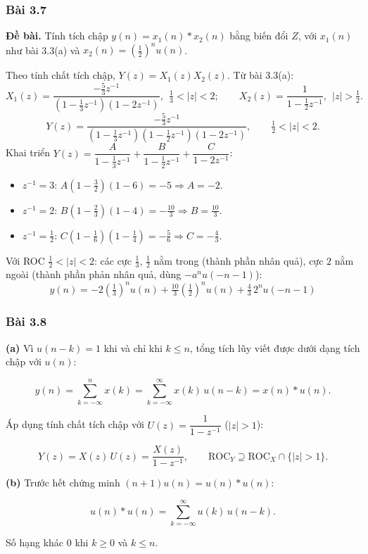 \documentclass[12pt,a4paper]{article}
\begin{document}
\subsubsection*{Bài 3.7}
\textbf{Đề bài.} Tính tích chập $y(n)=x_1(n)*x_2(n)$ bằng biến đổi $Z$, với $x_1(n)$ như bài 3.3(a) và $x_2(n)=\left(\tfrac12\right)^nu(n)$.

Theo tính chất tích chập, $Y(z)=X_1(z)X_2(z)$. Từ bài 3.3(a):
\[
X_1(z)=\frac{-\frac53z^{-1}}{\left(1-\frac13z^{-1}\right)\left(1-2z^{-1}\right)},\ \ \tfrac13<|z|<2;\qquad
X_2(z)=\frac{1}{1-\frac12z^{-1}},\ \ |z|>\tfrac12.
\]
\[
Y(z)=\frac{-\frac53z^{-1}}{\left(1-\frac13z^{-1}\right)\left(1-\frac12z^{-1}\right)\left(1-2z^{-1}\right)},\qquad \tfrac12<|z|<2.
\]
Khai triển $Y(z)=\dfrac{A}{1-\frac13z^{-1}}+\dfrac{B}{1-\frac12z^{-1}}+\dfrac{C}{1-2z^{-1}}$:
\begin{itemize}[leftmargin=*]
    \item $z^{-1}=3$: $A\left(1-\tfrac32\right)(1-6)=-5\Rightarrow A=-2$.
    \item $z^{-1}=2$: $B\left(1-\tfrac23\right)(1-4)=-\tfrac{10}{3}\Rightarrow B=\tfrac{10}{3}$.
    \item $z^{-1}=\tfrac12$: $C\left(1-\tfrac16\right)\left(1-\tfrac14\right)=-\tfrac56\Rightarrow C=-\tfrac43$.
\end{itemize}
Với ROC $\tfrac12<|z|<2$: các cực $\tfrac13$, $\tfrac12$ nằm trong (thành phần nhân quả), cực $2$ nằm ngoài (thành phần phản nhân quả, dùng $-a^nu(-n-1)$):
\[
\boxed{\,y(n)=-2\left(\tfrac13\right)^nu(n)+\tfrac{10}{3}\left(\tfrac12\right)^nu(n)+\tfrac43\,2^nu(-n-1)\,}
\]

\subsubsection*{Bài 3.8}
\textbf{(a)} Vì \(u(n-k)=1\) khi và chỉ khi \(k\le n\), tổng tích lũy
viết được dưới dạng tích chập với \(u(n)\):

\[y(n)=\sum_{k=-\infty}^{n}x(k)=\sum_{k=-\infty}^{\infty}x(k)\,u(n-k)=x(n)*u(n).\]

Áp dụng tính chất tích chập với \(U(z)=\dfrac{1}{1-z^{-1}}\)
(\(|z|>1\)):

\[Y(z)=X(z)\,U(z)=\frac{X(z)}{1-z^{-1}},\qquad \text{ROC}_Y\supseteq\text{ROC}_X\cap\{|z|>1\}.\]

\textbf{(b)} Trước hết chứng minh \((n+1)u(n)=u(n)*u(n)\):

\[u(n)*u(n)=\sum_{k=-\infty}^{\infty}u(k)\,u(n-k).\]

Số hạng khác 0 khi \(k\ge0\) và \(k\le n\).
\end{document}
